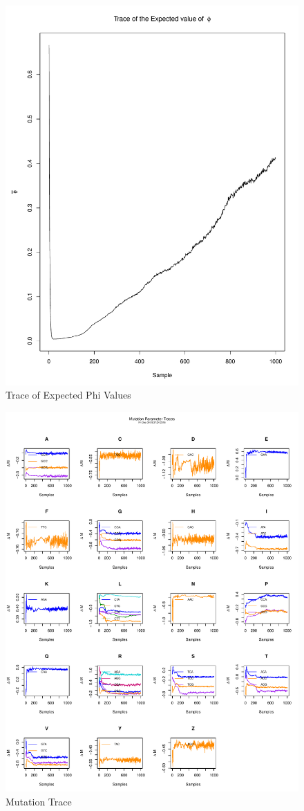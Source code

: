 \documentclass[11pt]{labbook}
\begin{document}
    \begin{figure}
        \centering
        \includegraphics[scale=.65]{FONSE_Plots/2016/December_8/expectedPhi_trace}
        \caption{Trace of Expected Phi Values}
        \label{fig:DEC8_EPHI}
    \end{figure}
    \begin{figure}
        \centering
        \includegraphics[scale=.65]{FONSE_Plots/2016/December_8/mutation_trace}
        \caption{Mutation Trace}
        \label{fig:DEC8_MUT}
    \end{figure}
\end{document}
